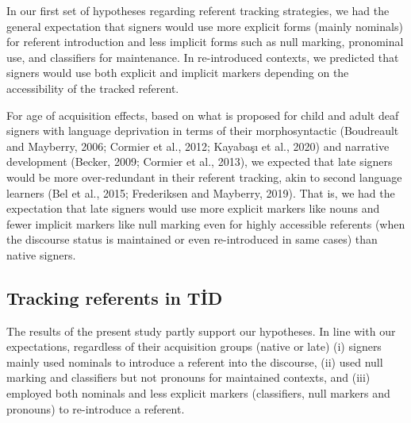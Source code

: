 \documentclass[]{elsarticle} %
\begin{document}
In our first set of hypotheses regarding referent tracking strategies,
we had the general expectation that signers would use more explicit
forms (mainly nominals) for referent introduction and less implicit
forms such as null marking, pronominal use, and classifiers for
maintenance. In re-introduced contexts, we predicted that signers would
use both explicit and implicit markers depending on the accessibility of
the tracked referent.

For age of acquisition effects, based on what is proposed for child and
adult deaf signers with language deprivation in terms of their
morphosyntactic (Boudreault and Mayberry, 2006; Cormier et al., 2012;
Kayabaşı et al., 2020) and narrative development (Becker, 2009; Cormier
et al., 2013), we expected that late signers would be more
over-redundant in their referent tracking, akin to second language
learners (Bel et al., 2015; Frederiksen and Mayberry, 2019). That is, we
had the expectation that late signers would use more explicit markers
like nouns and fewer implicit markers like null marking even for highly
accessible referents (when the discourse status is maintained or even
re-introduced in same cases) than native signers.

\hypertarget{tracking-referents-in-tid}{%
\subsection{Tracking referents in TİD}\label{tracking-referents-in-tid}}

The results of the present study partly support our hypotheses. In line
with our expectations, regardless of their acquisition groups (native or
late) (i) signers mainly used nominals to introduce a referent into the
discourse, (ii) used null marking and classifiers but not pronouns for
maintained contexts, and (iii) employed both nominals and less explicit
markers (classifiers, null markers and pronouns) to re-introduce a
referent.
\end{document}
